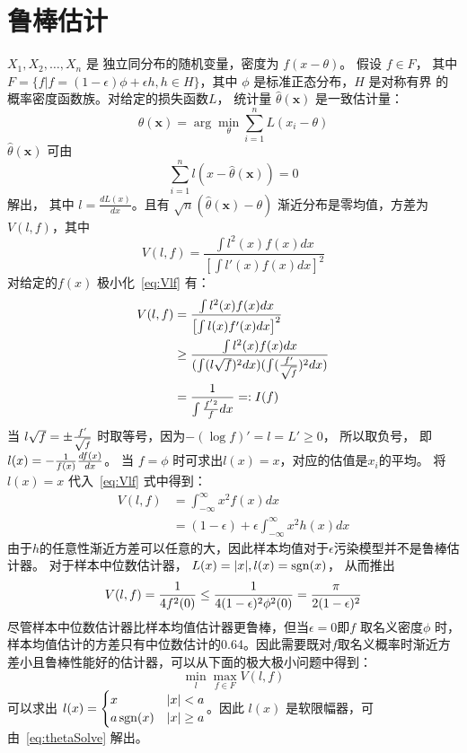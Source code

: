 \documentclass{ctexart}
\numberwithin{equation}{section}
\DeclarePairedDelimiter\abs{\lvert}{\rvert}
\DeclareMathOperator\sgn{sgn}
\begin{document}
\section{鲁棒估计}
 $X_1, X_2, \dots, X_n $ 是 独立同分布的随机变量，密度为 $ f(x - \theta) $。
 假设 $ f \in F $， 其中 $ F = \{ f | f = (1-\epsilon) \phi + \epsilon h, h \in H \} $，其中 $ \phi $ 是标准正态分布，$ H$ 是对称有界
 的概率密度函数族。对给定的损失函数$ L $， 统计量 $ \hat{\theta}(\bm{x}) $ 是一致估计量：
 \begin{equation}
 \hat{\theta}(\bm{x}) = \arg \min_{\theta} \sum_{i=1}^n L(x_i - \theta)
 \end{equation}
$ \hat{\theta}(\bm{x}) $ 可由 
\begin{equation}\label{eq:thetaSolve}
\sum_{i=1}^n l(x - \hat{\theta}(\bm{x})) = 0
\end{equation}
解出，
其中 $  l = \frac{d L(x)}{dx} $。且有 $ \sqrt{n} ( \hat{\theta}(\bm{x} )- \theta ) $ 渐近分布是零均值，方差为 $V(l,f)$，其中
 \begin{equation}\label{eq:Vlf}
V(l, f) = \frac{ \int l^2(x) f(x) dx }{\left[ \int l'(x)f(x) dx\right]^2}
 \end{equation}
  对给定的$f(x)$ 极小化~\eqref{eq:Vlf} 有：
\begin{align*}
  V(l, f) &= \frac{ \int l^2(x) f(x) dx }{\left[ \int l(x)f'(x) dx\right]^2} \\
  & \geq \frac{ \int l^2(x) f(x) dx }{(\int (l \sqrt{f})^2 dx)(\int ({f' \over \sqrt{f}})^2 dx )} \\
  & = \frac{1}{\int {f^{'2} \over f} dx }=: I(f)
\end{align*}
当 $l \sqrt{f} = \pm {f' \over \sqrt{f}} $ 时取等号，因为$-(\log f)' = l  = L'\geq 0$， 所以取负号，
即 $ l(x) = -{1 \over f(x)}\frac{df(x)}{dx}$。
当 $ f = \phi $ 时可求出$ l(x) = x$，对应的估值是$x_i$的平均。 将$l(x)=x$ 代入~\eqref{eq:Vlf} 式中得到：
\begin{align*}
V(l, f) & = \int_{-\infty}^{\infty} x^2 f(x) dx \\
& = (1-\epsilon) + \epsilon \int_{-\infty}^{\infty} x^2 h(x) dx
\end{align*}
由于$h$的任意性渐近方差可以任意的大，因此样本均值对于$\epsilon$污染模型并不是鲁棒估计器。
对于样本中位数估计器， $ L(x) = \abs{x}, l(x) = \sgn(x)$， 从而推出
$$
V(l, f) = {1 \over 4f^2(0) } \leq {1 \over 4(1-\epsilon)^2 \phi^2(0)} = { \pi \over 2(1-\epsilon)^2 }
$$
尽管样本中位数估计器比样本均值估计器更鲁棒，但当$\epsilon = 0 $即$ f$ 取名义密度$\phi$ 时，
样本均值估计的方差只有中位数估计的0.64。因此需要既对$f$取名义概率时渐近方差小且鲁棒性能好的估计器，可以从下面的极大极小问题中得到：
$$
\min_l \max_{f\in F} V(l, f)
$$
可以求出 $ l(x) = \begin{cases} x & \abs{x} < a \\
a \sgn(x) & \abs{x} \geq a \end{cases}$。因此 $l(x)$ 是软限幅器，可由~\eqref{eq:thetaSolve} 解出。
\end{document}
